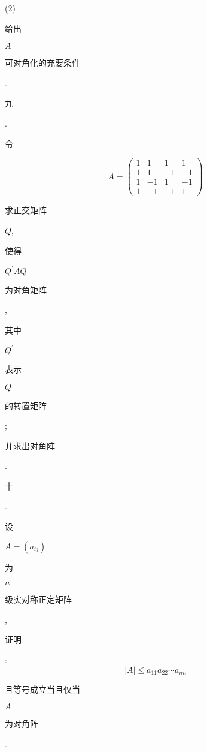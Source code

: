 \documentclass[10pt]{article}
\begin{document}
(2) \begin{CJK}{UTF8}{mj}给出\end{CJK} $A$ \begin{CJK}{UTF8}{mj}可对角化的充要条件\end{CJK}.

\begin{CJK}{UTF8}{mj}九\end{CJK}. \begin{CJK}{UTF8}{mj}令\end{CJK}
$$
A=\left(\begin{array}{cccc}
1 & 1 & 1 & 1 \\
1 & 1 & -1 & -1 \\
1 & -1 & 1 & -1 \\
1 & -1 & -1 & 1
\end{array}\right)
$$
\begin{CJK}{UTF8}{mj}求正交矩阵\end{CJK} $Q$, \begin{CJK}{UTF8}{mj}使得\end{CJK} $Q^{\prime} A Q$ \begin{CJK}{UTF8}{mj}为对角矩阵\end{CJK}, \begin{CJK}{UTF8}{mj}其中\end{CJK} $Q^{\prime}$ \begin{CJK}{UTF8}{mj}表示\end{CJK} $Q$ \begin{CJK}{UTF8}{mj}的转置矩阵\end{CJK}; \begin{CJK}{UTF8}{mj}并求出对角阵\end{CJK}.

\begin{CJK}{UTF8}{mj}十\end{CJK}. \begin{CJK}{UTF8}{mj}设\end{CJK} $A=\left(a_{i j}\right)$ \begin{CJK}{UTF8}{mj}为\end{CJK} $n$ \begin{CJK}{UTF8}{mj}级实对称正定矩阵\end{CJK}, \begin{CJK}{UTF8}{mj}证明\end{CJK}:
$$
|A| \leqslant a_{11} a_{22} \cdots a_{n n}
$$
\begin{CJK}{UTF8}{mj}且等号成立当且仅当\end{CJK} $A$ \begin{CJK}{UTF8}{mj}为对角阵\end{CJK}.
\end{document}
